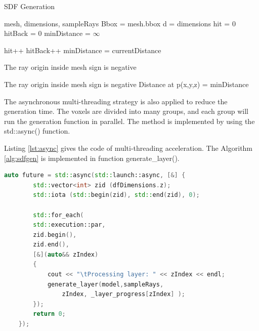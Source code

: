 \begin{breakablealgorithm}
    \caption{SDF Generation}
    \label{alg:sdfgen}
    \begin{algorithmic}
        \Require mesh, dimensions, sampleRays
        \Statex
        \State Bbox = mesh.bbox     
        \State d = dimensions
        \State hit = 0
        \State hitBack = 0
        \Statex
            \State minDistance = $ \infty $

                \State hit++
                \State hitBack++
                \EndIf
                \State minDistance = currentDistance
                \EndIf
            \EndIf
            \EndFor

            \State The ray origin inside mesh
            \State sign is negative
            \EndIf

            \State The ray origin inside mesh
            \State sign is negative
            \EndIf
        \State Distance at p(x,y,z) = minDistance
        \EndFor
    \end{algorithmic}
\end{breakablealgorithm}

The asynchronous multi-threading strategy is also applied to reduce the generation time. The voxels are divided into many groups, and each group will run the generation function in parallel. The method is implemented by using the std::async() function. 

\hspace*{\fill}

Listing \ref{lst:async} gives the code of multi-threading acceleration. The Algorithm \ref{alg:sdfgen} is implemented in function generate\_layer().

\begin{lstlisting}[language=C++, label={lst:async}, caption = Function of generating sample rays for voxels]
    auto future = std::async(std::launch::async, [&] {
        std::vector<int> zid (dfDimensions.z);
        std::iota (std::begin(zid), std::end(zid), 0); 
        
        std::for_each(
        std::execution::par,
        zid.begin(),
        zid.end(),
        [&](auto&& zIndex)
        {
            cout << "\tProcessing layer: " << zIndex << endl;
            generate_layer(model,sampleRays, 
                zIndex, _layer_progress[zIndex] );
        });
        return 0;
    });
\end{lstlisting}

